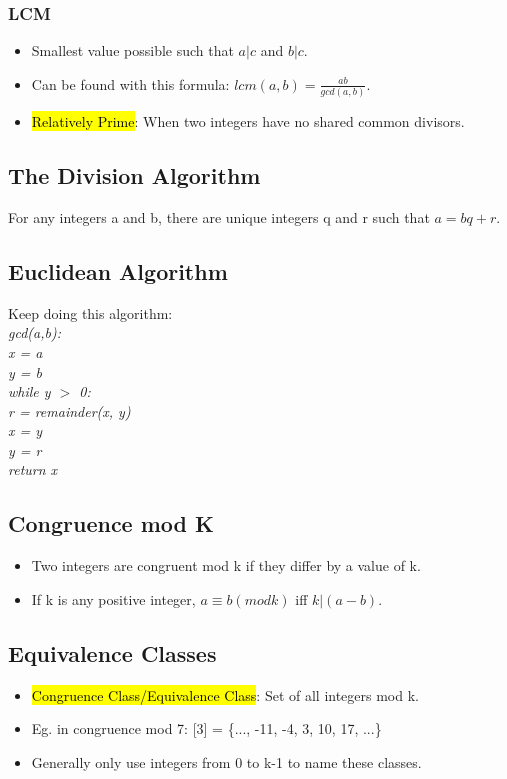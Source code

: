 \subsubsection{LCM}
\begin{itemize}
    \item Smallest value possible such that $a|c$ and $b|c$.
    \item Can be found with this formula: $lcm(a,b) = \frac{ab}{gcd(a,b)}$.
    \item \hl{Relatively Prime}: When two integers have no shared common divisors.
\end{itemize}

\subsection{The Division Algorithm}
For any integers a and b, there are unique integers q and r such that $a=bq+r$.

\subsection{Euclidean Algorithm}
Keep doing this algorithm: \\
\textit{gcd(a,b): \\
\indent x = a \\
\indent y = b \\
\indent while y $>$ 0: \\
\indent\indent r = remainder(x, y) \\
\indent\indent x = y \\
\indent\indent y = r \\
\indent return x \\}


\subsection{Congruence mod K}
\begin{itemize}
    \item Two integers are congruent mod k if they differ by a value of k.
    \item If k is any positive integer, $a\equiv b (mod k)$ iff $k|(a-b)$. 
\end{itemize}


\subsection{Equivalence Classes}
\begin{itemize}
    \item \hl{Congruence Class/Equivalence Class}: Set of all integers mod k.
    \item Eg. in congruence mod 7: [3] = \{..., -11, -4, 3, 10, 17, ...\}
    \item Generally only use integers from 0 to k-1 to name these classes.
\end{itemize}